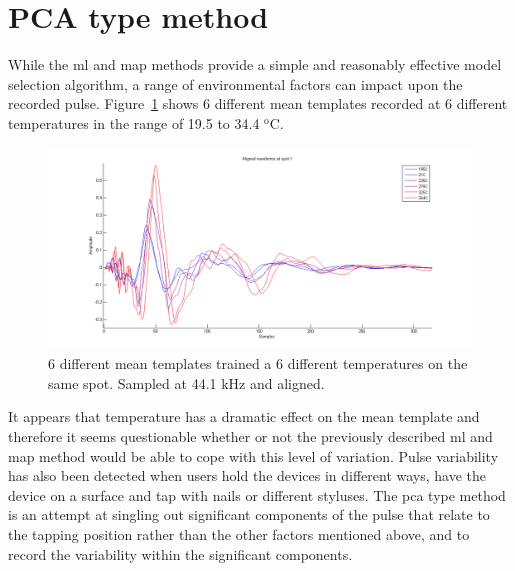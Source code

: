 \section{PCA type method}\label{sec:APRpca}
While the \gls{ml} and \gls{map} methods provide a simple and reasonably effective model selection algorithm, a range of environmental factors can impact upon the recorded pulse. Figure~\ref{fig:shiftOverTemperature} shows 6 different mean templates recorded at 6 different temperatures in the range of 19.5 to 34.4 $^\textrm{o}$C.

\begin{figure}[!]
\centering
\includegraphics[width=150mm]{shiftOverTemperature.png}
\caption{6 different mean templates trained a 6 different temperatures on the same spot. Sampled at 44.1 kHz and aligned.}\label{fig:shiftOverTemperature}
\end{figure}
It appears that temperature has a dramatic effect on the mean template and therefore it seems questionable whether or not the previously described \gls{ml} and \gls{map} method would be able to cope with this level of variation. Pulse variability has also been detected when users hold the devices in different ways, have the device on a surface and tap with nails or different styluses. The \gls{pca} type method is an attempt at singling out significant components of the pulse that relate to the tapping position rather than the other factors mentioned above, and to record the variability within the significant components.

